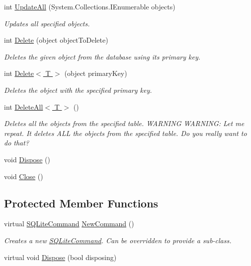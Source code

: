 \begin{DoxyCompactItemize}
$$int \hyperlink{class_s_q_lite_1_1_s_q_lite_connection_a1a95399fe5d61f8bbb56e36eac38d467}{Update\+All} (System.\+Collections.\+I\+Enumerable objects)
\begin{DoxyCompactList}\small\item\em Updates all specified objects. \end{DoxyCompactList}\item 
int \hyperlink{class_s_q_lite_1_1_s_q_lite_connection_a55234164e36bc4abcb086e197f25e436}{Delete} (object object\+To\+Delete)
\begin{DoxyCompactList}\small\item\em Deletes the given object from the database using its primary key. \end{DoxyCompactList}\item 
int \hyperlink{class_s_q_lite_1_1_s_q_lite_connection_a0d4046198236b8c96b0bf50593f592a6}{Delete$<$ T $>$} (object primary\+Key)
\begin{DoxyCompactList}\small\item\em Deletes the object with the specified primary key. \end{DoxyCompactList}\item 
int \hyperlink{class_s_q_lite_1_1_s_q_lite_connection_abed406a2cd17e1e360b79924a749b67c}{Delete\+All$<$ T $>$} ()
\begin{DoxyCompactList}\small\item\em Deletes all the objects from the specified table. W\+A\+R\+N\+I\+N\+G W\+A\+R\+N\+I\+N\+G\+: Let me repeat. It deletes A\+L\+L the objects from the specified table. Do you really want to do that? \end{DoxyCompactList}\item 
void \hyperlink{class_s_q_lite_1_1_s_q_lite_connection_ad9e1e281245e83dbe9c5303eaefe95f6}{Dispose} ()
\item 
void \hyperlink{class_s_q_lite_1_1_s_q_lite_connection_a74160304a4a218b7508220106eeb10d0}{Close} ()
\end{DoxyCompactItemize}
\subsection*{Protected Member Functions}
\begin{DoxyCompactItemize}
\item 
virtual \hyperlink{class_s_q_lite_1_1_s_q_lite_command}{S\+Q\+Lite\+Command} \hyperlink{class_s_q_lite_1_1_s_q_lite_connection_a7535db6cca83fcde078fa4340b32e982}{New\+Command} ()
\begin{DoxyCompactList}\small\item\em Creates a new \hyperlink{class_s_q_lite_1_1_s_q_lite_command}{S\+Q\+Lite\+Command}. Can be overridden to provide a sub-\/class. \end{DoxyCompactList}\item 
virtual void \hyperlink{class_s_q_lite_1_1_s_q_lite_connection_ab5e33e84b34867c48d1578d2890ff7e7}{Dispose} (bool disposing)
\end{DoxyCompactItemize}
